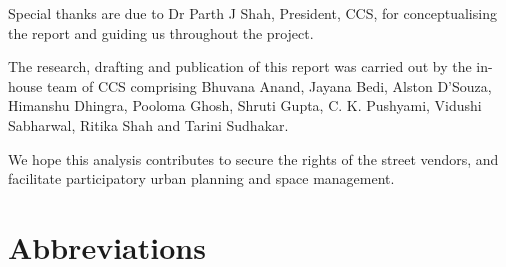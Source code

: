 \documentclass[a4paper, 12pt, twoside, table]{article}
\begin{document}
Special thanks are due to Dr Parth J Shah, President, CCS, for conceptualising the report and guiding us throughout the project. 

The research, drafting and publication of this report was carried out by the in-house team of CCS comprising Bhuvana Anand, Jayana Bedi, Alston D'Souza, Himanshu Dhingra, Pooloma Ghosh, Shruti Gupta, C. K. Pushyami, Vidushi Sabharwal, Ritika Shah and Tarini Sudhakar. 

We hope this analysis contributes to secure the rights of the street vendors, and facilitate participatory urban planning and space management.
\newpage
\tableofcontents

\newpage
{}

\section*{Abbreviations}
\end{document}
